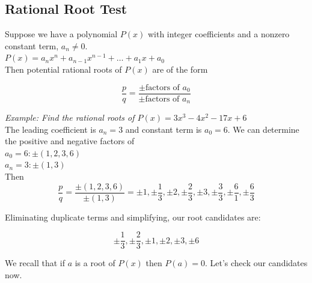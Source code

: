 \documentclass{article}
\begin{document}
    \subsection{Rational Root Test}

    Suppose we have a polynomial $P(x)$ with integer coefficients and a nonzero constant
    term, $a_n\not=0$. \\
    $P(x)=a_nx^n+a_{n-1}x^{n-1}+\dots+a_1x+a_0$ \\
    Then potential rational roots of $P(x)$ are of the form

    \begin{equation*}
        \frac{p}{q} = \frac{\pm\text{factors of }a_0}{\pm\text{factors of }a_n}
    \end{equation*}

    \noindent \color{blue} \textit{Example: Find the rational roots of
    $P(x)=3x^3-4x^2-17x+6$} \color{black} \\

    \noindent The leading coefficient is $a_n=3$ and constant term is $a_0=6$.
    We can determine the positive and negative factors of \\
    $a_0=6:\pm(1,2,3,6)$ \\
    $a_n=3:\pm(1,3)$ \\
    Then \\

    \begin{equation*}
        \frac{p}{q} = \frac{\pm(1,2,3,6)}{\pm(1,3)} = \pm 1, \pm\frac{1}{3}, \pm 2,
        \pm \frac{2}{3}, \pm 3, \pm \frac{3}{3}, \pm \frac{6}{1}, \pm \frac{6}{3}
    \end{equation*}

    \noindent Eliminating duplicate terms and simplifying, our root candidates are:

    \begin{equation*}
        \pm \frac{1}{3}, \pm\frac{2}{3}, \pm 1, \pm 2, \pm 3, \pm 6
    \end{equation*}

    \noindent We recall that if $a$ is a root of $P(x)$ then $P(a)=0$. Let's check our
    candidates now.
\end{document}
